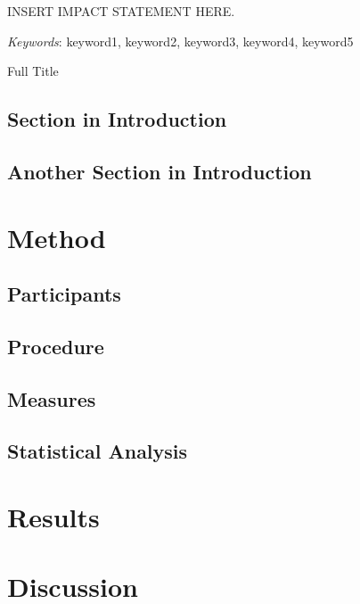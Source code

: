 \documentclass[
  american,
  letterpaper,
  12pt]{article}
\newcommand{\apatitle}[1]{%
  {\centering\bfseries #1\par}}
\begin{document}
INSERT IMPACT STATEMENT HERE.

\emph{Keywords}: keyword1, keyword2, keyword3, keyword4, keyword5

\clearpage

\apatitle{

Full Title

}

\subsection{Section in Introduction}\label{section-in-introduction}

\subsection{Another Section in
Introduction}\label{another-section-in-introduction}

\section{Method}\label{method}

\subsection{Participants}\label{participants}

\subsection{Procedure}\label{procedure}

\subsection{Measures}\label{measures}

\subsection{Statistical Analysis}\label{statistical-analysis}

\section{Results}\label{results}

\section{Discussion}\label{discussion}
\end{document}
